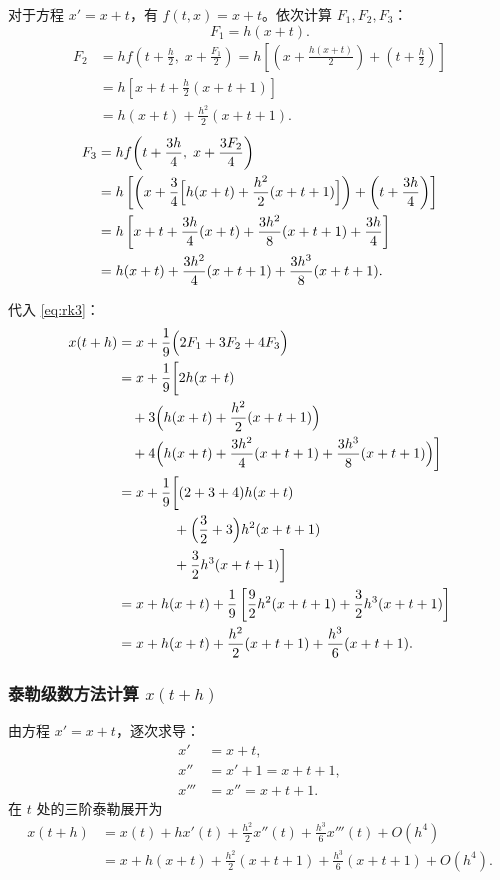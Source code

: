 \documentclass{article}
\begin{document}
对于方程 $x' = x + t$，有 $f(t,x) = x + t$。依次计算 $F_1, F_2, F_3$：
\[
F_1 = h(x + t).
\]
\[
\begin{aligned}
F_2 &= h f\!\left(t+\frac{h}{2},\; x + \frac{F_1}{2}\right) 
     = h\left[ \left(x + \frac{h(x+t)}{2}\right) + \left(t + \frac{h}{2}\right) \right] \\
    &= h\left[ x + t + \frac{h}{2}(x + t + 1) \right] \\
    &= h(x+t) + \frac{h^2}{2}(x+t+1).
\end{aligned}
\]
\[
\begin{aligned}
F_3 &= h f\!\left(t+\frac{3h}{4},\; x + \frac{3F_2}{4}\right) \\
    &= h\left[ \left(x + \frac{3}{4}\Bigl[h(x+t) + \frac{h^2}{2}(x+t+1)\Bigr]\right) + \left(t + \frac{3h}{4}\right) \right] \\
    &= h\left[ x + t + \frac{3h}{4}(x+t) + \frac{3h^2}{8}(x+t+1) + \frac{3h}{4} \right] \\
    &= h(x+t) + \frac{3h^2}{4}(x+t+1) + \frac{3h^3}{8}(x+t+1).
\end{aligned}
\]

代入 \eqref{eq:rk3}：
\[
\begin{aligned}
x(t+h) &= x + \frac{1}{9}\Bigl(2F_1 + 3F_2 + 4F_3\Bigr) \\
       &= x + \frac{1}{9}\biggl[ 2h(x+t) \\
       &\quad + 3\Bigl(h(x+t) + \frac{h^2}{2}(x+t+1)\Bigr) \\
       &\quad + 4\Bigl(h(x+t) + \frac{3h^2}{4}(x+t+1) + \frac{3h^3}{8}(x+t+1)\Bigr) \biggr] \\
       &= x + \frac{1}{9}\biggl[ (2+3+4)h(x+t) \\
       &\qquad\qquad + \Bigl(\frac{3}{2} + 3\Bigr)h^2(x+t+1) \\
       &\qquad\qquad + \frac{3}{2}h^3(x+t+1) \biggr] \\
       &= x + h(x+t) + \frac{1}{9}\left[ \frac{9}{2}h^2(x+t+1) + \frac{3}{2}h^3(x+t+1) \right] \\
       &= x + h(x+t) + \frac{h^2}{2}(x+t+1) + \frac{h^3}{6}(x+t+1).
\end{aligned}
\]

\subsubsection*{泰勒级数方法计算 $x(t+h)$}

由方程 $x' = x + t$，逐次求导：
\[
\begin{aligned}
x'    &= x + t, \\
x''   &= x' + 1 = x + t + 1, \\
x'''  &= x'' = x + t + 1.
\end{aligned}
\]
在 $t$ 处的三阶泰勒展开为
\[
\begin{aligned}
x(t+h) &= x(t) + h x'(t) + \frac{h^2}{2} x''(t) + \frac{h^3}{6} x'''(t) + O(h^4) \\
       &= x + h(x+t) + \frac{h^2}{2}(x+t+1) + \frac{h^3}{6}(x+t+1) + O(h^4).
\end{aligned}
\]
\end{document}
